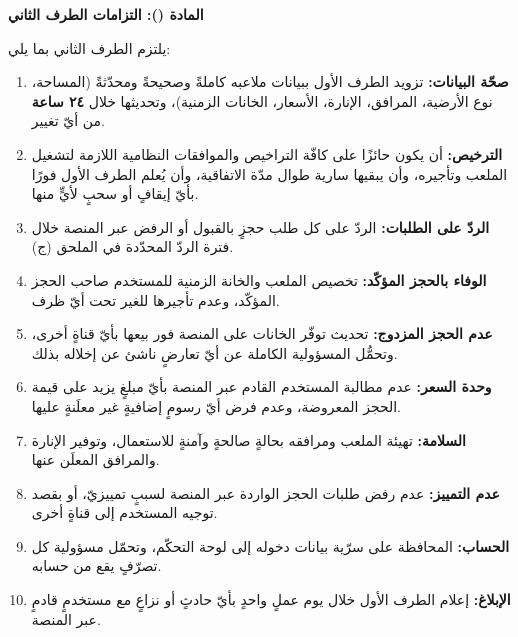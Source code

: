 \documentclass[12pt,a4paper]{article}
\newcounter{bndc}
\newcommand{\bnd}[1]{%
  \vspace{10pt}\par\noindent
  {\color{teal}\bfseries\large المادة (\arabic{bndc}): #1}%
  \stepcounter{bndc}%
  \par\vspace{2pt}\noindent{\color{rule}\rule{\linewidth}{0.6pt}}\par\vspace{4pt}%
}
\newcommand{\mlh}[1]{{\bfseries #1}}
\newenvironment{bnditems}
  {\begin{enumerate}[label=\arabic{bndc}.\arabic*,leftmargin=1.6em,itemsep=3pt,topsep=3pt]}
  {\end{enumerate}}
\begin{document}
\bnd{التزامات الطرف الثاني}
يلتزم الطرف الثاني بما يلي:
\begin{bnditems}
  \item \mlh{صحّة البيانات:} تزويد الطرف الأول ببيانات ملاعبه كاملةً وصحيحةً ومحدّثةً (المساحة، نوع الأرضية، المرافق، الإنارة، الأسعار، الخانات الزمنية)، وتحديثها خلال \mlh{٢٤ ساعة} من أيّ تغيير.
  \item \mlh{الترخيص:} أن يكون حائزًا على كافّة التراخيص والموافقات النظامية اللازمة لتشغيل الملعب وتأجيره، وأن يبقيها سارية طوال مدّة الاتفاقية، وأن يُعلم الطرف الأول فورًا بأيّ إيقافٍ أو سحبٍ لأيٍّ منها.
  \item \mlh{الردّ على الطلبات:} الردّ على كل طلب حجزٍ بالقبول أو الرفض عبر المنصة خلال فترة الردّ المحدّدة في الملحق (ج).
  \item \mlh{الوفاء بالحجز المؤكّد:} تخصيص الملعب والخانة الزمنية للمستخدم صاحب الحجز المؤكّد، وعدم تأجيرها للغير تحت أيّ ظرف.
  \item \mlh{عدم الحجز المزدوج:} تحديث توفّر الخانات على المنصة فور بيعها بأيّ قناةٍ أخرى، وتحمُّل المسؤولية الكاملة عن أيّ تعارضٍ ناشئ عن إخلاله بذلك.
  \item \mlh{وحدة السعر:} عدم مطالبة المستخدم القادم عبر المنصة بأيّ مبلغٍ يزيد على قيمة الحجز المعروضة، وعدم فرض أيّ رسومٍ إضافيةٍ غير معلَنةٍ عليها.
  \item \mlh{السلامة:} تهيئة الملعب ومرافقه بحالةٍ صالحةٍ وآمنةٍ للاستعمال، وتوفير الإنارة والمرافق المعلَن عنها.
  \item \mlh{عدم التمييز:} عدم رفض طلبات الحجز الواردة عبر المنصة لسببٍ تمييزيّ، أو بقصد توجيه المستخدم إلى قناةٍ أخرى.
  \item \mlh{الحساب:} المحافظة على سرّية بيانات دخوله إلى لوحة التحكّم، وتحمّل مسؤولية كل تصرّفٍ يقع من حسابه.
  \item \mlh{الإبلاغ:} إعلام الطرف الأول خلال يوم عملٍ واحدٍ بأيّ حادثٍ أو نزاعٍ مع مستخدمٍ قادمٍ عبر المنصة.
\end{bnditems}
\end{document}
